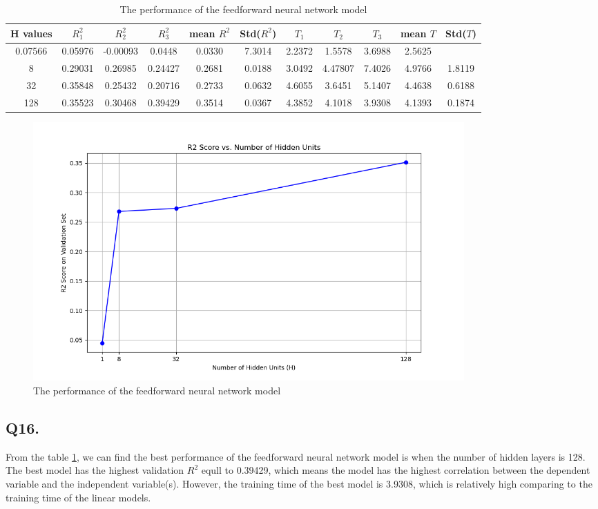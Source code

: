 \documentclass{article}
\begin{document}
\begin{table}[h!]
    \centering
    \small
    \begin{tabular}{|c|c|c|c|c|c|c|c|c|c|c|}
        \hline
        H values & $R^2_1$ & $R^2_2$ & $R^2_3$ & mean $R^2$ & Std($R^2$) & $T_1$ & $T_2$ & $T_3$ & mean $T$ & Std($T$) \\
        \hline
        0.07566 & 0.05976 &  -0.00093 & 0.0448 & 0.0330 & 7.3014 & 2.2372 & 1.5578  & 3.6988 & 2.5625\\
        8 & 0.29031 & 0.26985 & 0.24427 & 0.2681 & 0.0188 & 3.0492 & 4.47807 & 7.4026 & 4.9766 & 1.8119 \\
        32 & 0.35848 & 0.25432 & 0.20716 & 0.2733 & 0.0632 & 4.6055 & 3.6451 & 5.1407 & 4.4638 & 0.6188 \\
        128 & 0.35523 & 0.30468& 0.39429 & 0.3514 & 0.0367 & 4.3852 & 4.1018 & 3.9308 & 4.1393 & 0.1874 \\
        \hline
    \end{tabular}
    \caption{The performance of the feedforward neural network model}
    \label{tab:Feedforward}
\end{table}

\begin{figure}[h!]
    \centering
    \includegraphics[width=0.8\textwidth]{./pic/R2_Score_vs_Hidden_Units.png}
    \caption{The performance of the feedforward neural network model}
    \label{fig:feedforward}
\end{figure}


\subsection*{Q16.}

From the table \ref{tab:Feedforward}, we can find the best performance of the feedforward neural network model is when the number of hidden layers is 128.
The best model has the highest validation $R^2$ equll to 0.39429, which means the model has the highest correlation between the dependent variable and the independent variable(s).
However, the training time of the best model is 3.9308, which is relatively high comparing to the training time of the linear models.
\end{document}
